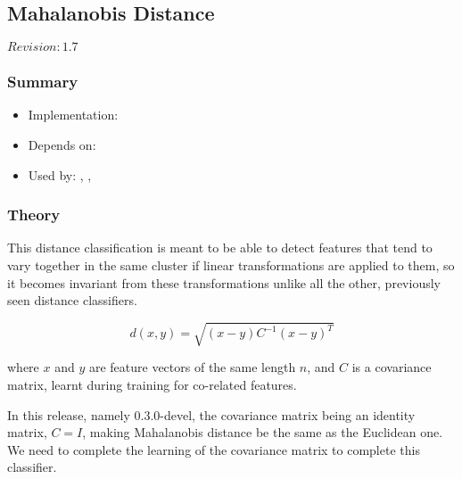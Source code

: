 \subsection{Mahalanobis Distance}
\label{sect:mahalanobis}

$Revision: 1.7 $

\subsubsection{Summary}

\begin{itemize}
\item Implementation: 
\item Depends on: 
\item Used by: , , 
\end{itemize}

\subsubsection{Theory}

This distance classification is meant to be able to detect features
that tend to vary together in the same cluster if linear
transformations are applied to them, so it becomes invariant
from these transformations unlike all the other, previously seen
distance classifiers.

$$ d(x,y) = \sqrt{(x-y) C^{-1} (x-y)^{T}} $$

\noindent
where $x$ and $y$ are feature vectors of the same length $n$, and
$C$ is a covariance matrix, learnt during training for co-related
features.

In this release, namely 0.3.0-devel,
the covariance matrix being an identity matrix, $ C = I $,
making Mahalanobis distance be the same as the Euclidean one.
We need to complete the learning of the covariance matrix
to complete this classifier.

